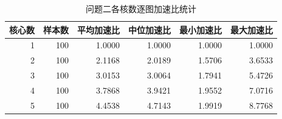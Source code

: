 \begin{table}[htbp]
\centering\small
\setlength{\tabcolsep}{5pt}
\begin{tabular}{rrrrrr}
\toprule
核心数 & 样本数 & 平均加速比 & 中位加速比 & 最小加速比 & 最大加速比 \\
\midrule
1 & 100 & 1.0000 & 1.0000 & 1.0000 & 1.0000 \\
2 & 100 & 2.1168 & 2.0189 & 1.5706 & 3.6533 \\
3 & 100 & 3.0153 & 3.0064 & 1.7941 & 5.4726 \\
4 & 100 & 3.7868 & 3.9421 & 1.9552 & 7.0716 \\
5 & 100 & 4.4538 & 4.7143 & 1.9919 & 8.7768 \\
\bottomrule
\end{tabular}
\caption{问题二各核数逐图加速比统计}\label{tab:q2_mean}
\end{table}
